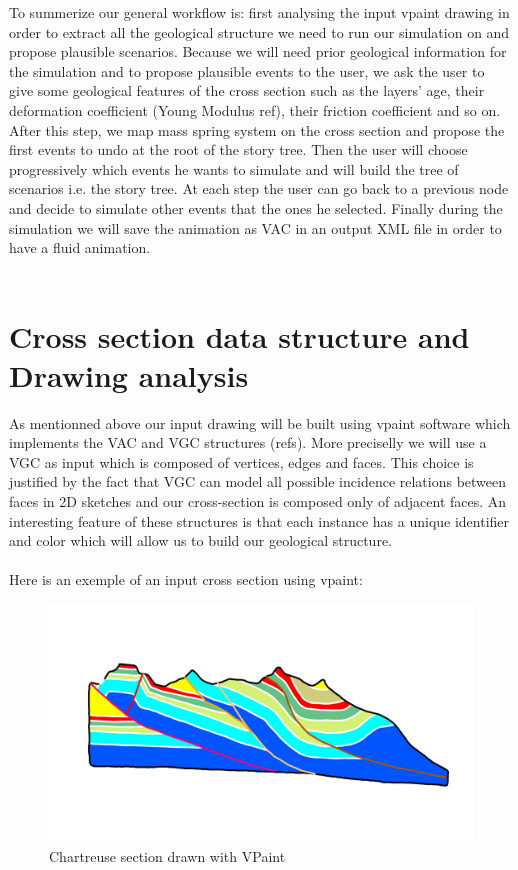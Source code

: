 \documentclass[12pt, a4paper]{memoir} %
\begin{document}
To summerize our general workflow is: first analysing the input vpaint drawing in order to extract all the geological structure we need to run our simulation on and propose plausible scenarios. Because we will need prior geological information for the simulation and to propose plausible events to the user, we ask the user to give some geological features of the cross section such as the layers' age, their deformation coefficient (Young Modulus ref), their friction coefficient and so on.\\ 
After this step, we map mass spring system on the cross section and propose the first events to undo at the root of the story tree. 
Then the user will choose progressively which events he wants to simulate and will build the tree of scenarios i.e. the story tree. At each step the user can go back to a previous node and decide to simulate other events that the ones he selected.
Finally during the simulation we will save the animation as VAC in an output XML file in order to have a fluid animation.\\\\

\section{Cross section data structure and Drawing analysis}

As mentionned above our input drawing will be built using vpaint software which implements the VAC and VGC structures (refs).
More preciselly we will use a VGC as input which is composed of vertices, edges and faces. This choice is justified by the fact that VGC can model all possible incidence relations between faces in 2D sketches and our cross-section is composed only of adjacent faces. An interesting feature of these structures is that each instance has a unique identifier and color which will allow us to build our geological structure.\\\\
Here is an exemple of an input cross section using vpaint:

 \begin{figure}[H]
	\centering
	\includegraphics[scale=0.5]{chartreusevpaint.png}
	\caption{Chartreuse section drawn with VPaint}
\end{figure}
\end{document}
